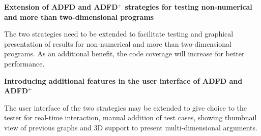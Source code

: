 \textbf{Extension of ADFD and ADFD$^+$ strategies for testing non-numerical and more than two-dimensional programs}

The two strategies need to be extended to facilitate testing and graphical presentation of results for non-numerical and more than two-dimensional programs. As an additional benefit, the code coverage will increase for better performance.










\textbf{Introducing additional features in the user interface of ADFD and ADFD$^+$}

The user interface of the two strategies may be extended to give choice to the tester for real-time interaction, manual addition of test cases, showing thumbnail view of previous graphs and 3D support to present multi-dimensional arguments.




\clearpage
\newpage

